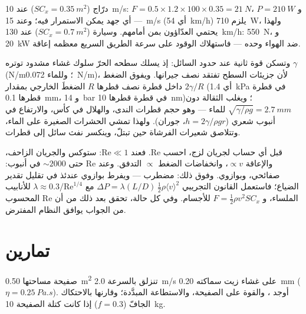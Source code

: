 \begin{example}[درّاج وسيارة]\label{ex:b2:viscous-flows:cyclist}
درّاج ($SC_x = \qty{0.35}{m^2}$) عند \qty{10}{m/s}: $F = 0.5 \times 1.2 \times 100
\times 0.35 = \qty{21}{N}$، و $P = \qty{210}{W}$ --- أي جهد يمكن الاستمرار فيه؛ وعند \qty{15}{m/s}
(أي \qty{54}{km/h}) يلزم \qty{710}{W}، ولهذا يحتمي العدّاؤون بمن أمامهم.
وسيارة ($SC_x = \qty{0.7}{m^2}$) عند \qty{130}{km/h}: \qty{550}{N}، و \qty{20}{kW} ضد
الهواء وحده --- فاستهلاك الوقود على سرعة الطريق السريع معظمه إعاقة.
\end{example}

\begin{remark}\label{rem:b2:viscous-flows:capillarity}
وتسكن قوة ثانية عند حدود السائل: إذ يسلك سطحه الحرّ
سلوك غشاء مشدود توتره $\gamma$ (\unit{N/m}؛ وللماء
\qty{0.072}{N/m})، لأن جزيئات السطح تفتقد نصف جيرانها.
ويفوق الضغط داخل قطرة نصف قطرها $R$ الضغطَ الخارجي بمقدار
\emph{} $2\gamma/R$ (أي \qty{1.4}{kPa} في قطرة قطرها \qty{0.1}{mm}،
و \qty{14}{bar} في قطرة قطرها \qty{10}{nm})؛ ويغلب  الثقالة دون
\emph{} $\sqrt{\gamma/\rho g} = \qty{2.7}{mm}$ للماء ---
وهو حجم قطرات الندى، والهلال في كأس، والارتفاع في أنبوب
شعري ($h = 2\gamma/\rho gr$، جوران). ولهذا تمشي الحشرات الصغيرة
على الماء، وتتلاصق شعيرات الفرشاة حين تبتلّ، وينكسر
نفث سائل إلى قطرات.
\end{remark}

\begin{method}[أي نظام؟]\label{met:b2:viscous-flows:regime}
قبل أي حساب لجريان لزج، احسب $\mathrm{Re}$. فعند $\mathrm{Re} \ll 1$:
ستوكس والجريان الزاحف، والإعاقة $\propto v$، وانخفاضات الضغط $\propto$
التدفق. وعند $\mathrm{Re}$ حتى $\sim\!2000$ في أنبوب: صفائحي، وبوازوي. وفوق ذلك:
مضطرب --- ويفرط بوازوي عندئذ في تقليل تقدير الضياع؛ فاستعمل
القانون التجريبي $\Delta P = \lambda(L/D)\,\tfrac12\rho\langle v\rangle^2$ مع $\lambda
\approx 0.3/\mathrm{Re}^{1/4}$ للأنابيب الملساء، و $F = \tfrac12\rho v^2SC_x$
للأجسام. وفي كل حالة، تحقق بعد ذلك من أن $\mathrm{Re}$ المحسوب
من الجواب يوافق النظام المفترض.
\end{method}

\section{تمارين}

\begin{exercise}[$\star$]\label{exo:b2:viscous-flows:1}
صفيحة مساحتها \qty{0.50}{m^2} تنزلق بالسرعة \qty{2.0}{m/s} على غشاء
زيت سماكته \qty{0.20}{mm} ($\eta = \qty{0.25}{Pa.s}$). أوجد ،
والقوة على الصفيحة، والاستطاعة المبدَّدة؛ وقارنها بالاحتكاك
الجافّ ($f = 0.3$) إذا كانت كتلة الصفيحة \qty{10}{kg}.
\end{exercise}

